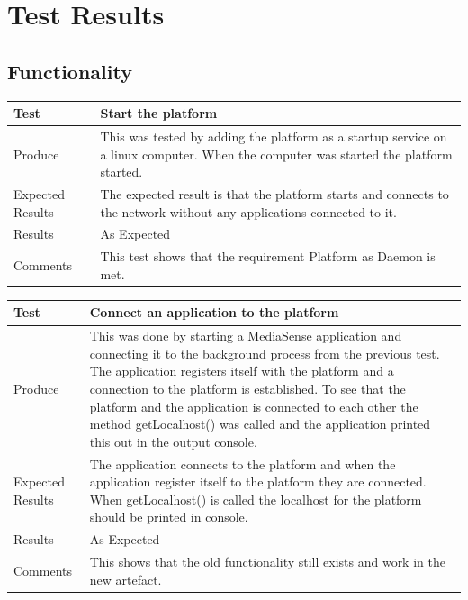\section{Test Results}
\subsection{Functionality}

\begin{center}
    \begin{tabular}{ | l | p{12cm} |}
    \hline
    Test 	 				& 		 Start the platform\\ \hline
	Produce  				& 		 This was tested by adding the platform as a startup service on a linux computer. When the computer was started the platform started.\\ \hline
	Expected Results  		& 		 The expected result is that the platform starts and connects to the network without any applications connected to it. \\ \hline
	Results 				& 		 As Expected\\ \hline
	Comments				& 		 This test shows that the requirement Platform as Daemon is met.\\ \hline
    \end{tabular}
\end{center}

\begin{center}
    \begin{tabular}{ | l | p{12cm} |}
    \hline
    Test 	 				& 		 Connect an application to the platform \\ \hline
	Produce  				& 		 This was done by starting a MediaSense application and connecting it to the background process from the previous test. The application registers itself with the platform and a connection to the platform is established. To see that the platform and the application is connected to each other the method getLocalhost() was called and the application printed this out in the output console. \\ \hline
	Expected Results  		& 		 The application connects to the platform and when the application register itself to the platform they are connected. When getLocalhost() is called the localhost for the platform should be printed in console. \\ \hline
	Results 				& 		 As Expected\\ \hline
	Comments				& 		 This shows that the old functionality still exists and work in the new artefact.\\ \hline
    \end{tabular}
\end{center}

